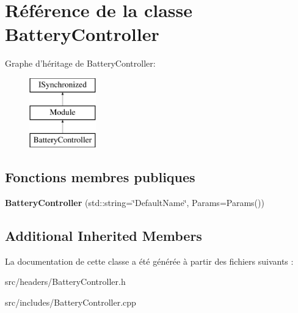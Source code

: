 \hypertarget{classBatteryController}{\section{Référence de la classe Battery\-Controller}
\label{classBatteryController}
}
Graphe d'héritage de Battery\-Controller\-:\begin{figure}[H]
\begin{center}
\leavevmode
\includegraphics[height=3.000000cm]{classBatteryController}
\end{center}
\end{figure}
\subsection*{Fonctions membres publiques}
\begin{DoxyCompactItemize}
\item 
\hypertarget{classBatteryController_ab50d44bc53cd3609bbb6ea3e609a6e98}{{\bfseries Battery\-Controller} (std\-::string=\char`\"{}Default\-Name\char`\"{}, Params=Params())}\label{classBatteryController_ab50d44bc53cd3609bbb6ea3e609a6e98}

\end{DoxyCompactItemize}
\subsection*{Additional Inherited Members}


La documentation de cette classe a été générée à partir des fichiers suivants \-:\begin{DoxyCompactItemize}
\item 
src/headers/Battery\-Controller.\-h\item 
src/includes/Battery\-Controller.\-cpp\end{DoxyCompactItemize}
